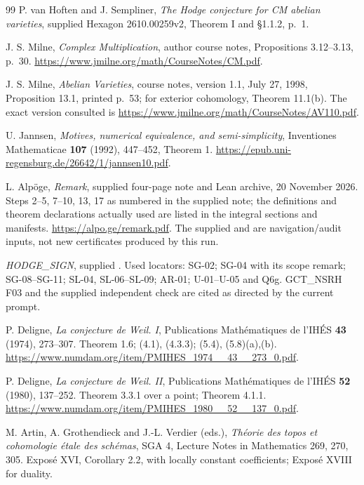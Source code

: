 \begin{thebibliography}{99}
P. van Hoften and J. Sempliner,
\emph{The Hodge conjecture for CM abelian varieties},
supplied Hexagon 2610.00259v2, Theorem I and \S1.1.2, p.~1.

J. S. Milne, \emph{Complex Multiplication}, author course notes,
Propositions 3.12--3.13, p.~30.
\url{https://www.jmilne.org/math/CourseNotes/CM.pdf}.

J. S. Milne, \emph{Abelian Varieties}, course notes,
version 1.1, July 27, 1998, Proposition 13.1, printed p.~53;
for exterior cohomology, Theorem 11.1(b).
The exact version consulted is
\url{https://www.jmilne.org/math/CourseNotes/AV110.pdf}.

U. Jannsen, \emph{Motives, numerical equivalence, and
semi-simplicity}, Inventiones Mathematicae \textbf{107}
(1992), 447--452, Theorem 1.
\url{https://epub.uni-regensburg.de/26642/1/jannsen10.pdf}.

L. Alp\"oge, \emph{Remark}, supplied four-page note and Lean archive,
20 November 2026. Steps 2--5, 7--10, 13, 17 as numbered in the
supplied note; the definitions and theorem declarations actually
used are listed in the integral sections and manifests.
\url{https://alpo.ge/remark.pdf}.
The supplied  and
 are navigation/audit inputs,
not new certificates produced by this run.

\emph{HODGE\_SIGN}, supplied
.
Used locators: SG-02; SG-04 with its scope remark;
SG-08--SG-11; SL-04, SL-06--SL-09;
AR-01; U-01--U-05 and Q6g.
GCT\_NSRH F03 and the supplied independent check are cited
as directed by the current prompt.

P. Deligne, \emph{La conjecture de Weil. I},
Publications Math\'ematiques de l'IH\'ES \textbf{43}
(1974), 273--307.
Theorem 1.6; (4.1), (4.3.3); (5.4), (5.8)(a),(b).
\url{https://www.numdam.org/item/PMIHES_1974__43__273_0.pdf}.

P. Deligne, \emph{La conjecture de Weil. II},
Publications Math\'ematiques de l'IH\'ES \textbf{52}
(1980), 137--252.
Theorem 3.3.1 over a point; Theorem 4.1.1.
\url{https://www.numdam.org/item/PMIHES_1980__52__137_0.pdf}.

M. Artin, A. Grothendieck and J.-L. Verdier (eds.),
\emph{Th\'eorie des topos et cohomologie \'etale des sch\'emas},
SGA 4, Lecture Notes in Mathematics 269, 270, 305.
Expos\'e XVI, Corollary 2.2, with locally constant coefficients;
Expos\'e XVIII for duality.


\end{thebibliography}
